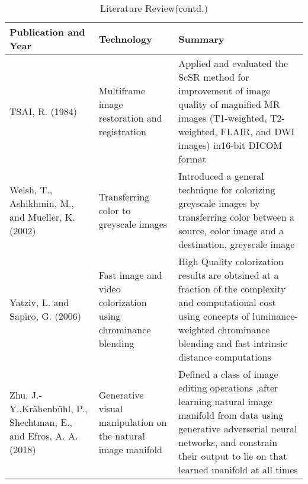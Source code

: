 \begin{table}[!htbp]
\begin{center}
\def\arraystretch{1.5}
  \begin{tabularx}{\textwidth}{| X | X | X | } \hline
Publication and Year & Technology & Summary \\ \hline

TSAI, R. (1984) & Multiframe image restoration and registration & Applied and evaluated the ScSR method for improvement of image quality of magnified MR images (T1-weighted, T2-weighted, FLAIR, and DWI images) in16-bit DICOM format \\ \hline

Welsh, T., Ashikhmin, M., and Mueller, K. (2002) & Transferring color to greyscale images &  Introduced a general technique for colorizing greyscale images by transferring color between a source, color image and a destination, greyscale image \\ \hline

Yatziv, L. and Sapiro, G. (2006) & Fast image and video colorization using chrominance blending & High Quality colorization results are obtsined at a fraction of the complexity and computational cost using concepts of luminance-weighted chrominance blending and fast intrinsic distance computations \\ \hline

Zhu, J.-Y.,Krähenbühl, P., Shechtman, E., and Efros, A. A. (2018) & Generative visual manipulation on the natural image manifold & Defined a class of image editing operations ,after learning natural image manifold from data using generative adverserial neural networks, and constrain their output to lie on that learned manifold at all times \\ \hline
\end{tabularx}
\caption{Literature Review(contd.)}
 \label{tab:hreq}
\end{center}

\end{table}
